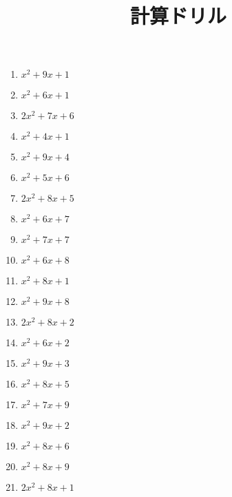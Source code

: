 \documentclass[9pt,dvipdfmx,a4paper]{article}
\begin{document}
    
\title{計算ドリル} 
\date{} 
\maketitle
\begin{multicols}{2}
 \begin{enumerate}

\item
$ x^{2} + 9 x + 1$

\item
$ x^{2} + 6 x + 1$

\item
$ 2 x^{2} + 7 x + 6$

\item
$ x^{2} + 4 x + 1$

\item
$ x^{2} + 9 x + 4$

\item
$ x^{2} + 5 x + 6$

\item
$ 2 x^{2} + 8 x + 5$

\item
$ x^{2} + 6 x + 7$

\item
$ x^{2} + 7 x + 7$

\item
$ x^{2} + 6 x + 8$

\item
$ x^{2} + 8 x + 1$

\item
$ x^{2} + 9 x + 8$

\item
$ 2 x^{2} + 8 x + 2$

\item
$ x^{2} + 6 x + 2$

\item
$ x^{2} + 9 x + 3$

\item
$ x^{2} + 8 x + 5$

\item
$ x^{2} + 7 x + 9$

\item
$ x^{2} + 9 x + 2$

\item
$ x^{2} + 8 x + 6$

\item
$ x^{2} + 8 x + 9$

\item
$ 2 x^{2} + 8 x + 1$


\end{enumerate}
\end{multicols}
\end{document}
